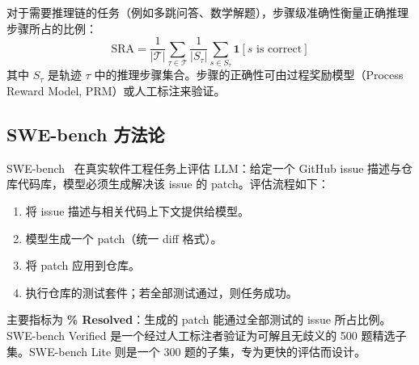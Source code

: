 对于需要推理链的任务（例如多跳问答、数学解题），步骤级准确性衡量正确推理步骤所占的比例：
\begin{equation}
    \text{SRA} = \frac{1}{|\mathcal{T}|} \sum_{\tau \in \mathcal{T}} \frac{1}{|S_\tau|} \sum_{s \in S_\tau} \mathbf{1}[s \text{ is correct}]
\end{equation}
其中 $S_\tau$ 是轨迹 $\tau$ 中的推理步骤集合。步骤的正确性可由过程奖励模型（Process Reward Model, PRM）或人工标注来验证。

\subsection{SWE-bench 方法论}
\label{swe-bench-methodology}

SWE-bench~\cite{jimenez2024swebench} 在真实软件工程任务上评估 LLM：给定一个 GitHub issue 描述与仓库代码库，模型必须生成解决该 issue 的 patch。评估流程如下：

\begin{enumerate}
  \item 将 issue 描述与相关代码上下文提供给模型。
  \item 模型生成一个 patch（统一 diff 格式）。
  \item 将 patch 应用到仓库。
  \item 执行仓库的测试套件；若全部测试通过，则任务成功。
\end{enumerate}

主要指标为 \textbf{\% Resolved}：生成的 patch 能通过全部测试的 issue 所占比例。SWE-bench Verified 是一个经过人工标注者验证为可解且无歧义的 500 题精选子集。SWE-bench Lite 则是一个 300 题的子集，专为更快的评估而设计。

